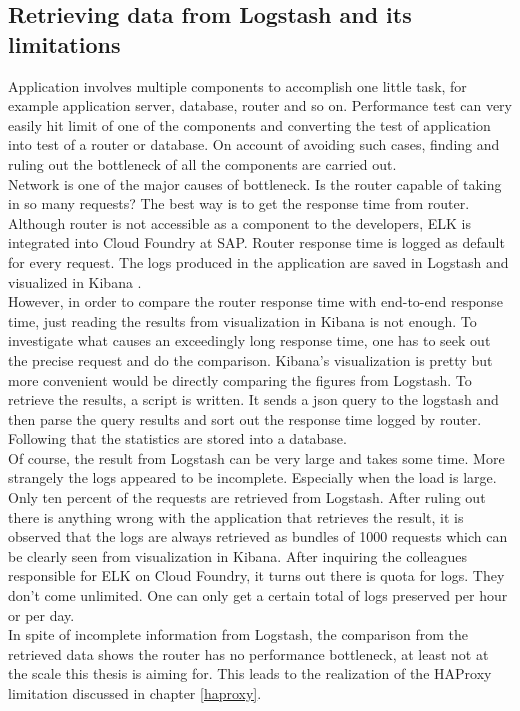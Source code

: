 \subsection{Retrieving data from Logstash and its limitations}
Application involves multiple components to accomplish one little task, for example application server, database, router and so on. Performance test can very easily hit limit of one of the components and converting the test of application into test of a router or database. On account of avoiding such cases, finding and ruling out the bottleneck of all the components are carried out. \\
Network is one of the major causes of bottleneck. Is the router capable of taking in so many requests? The best way is to get the response time from router. Although router is not accessible as a component to the developers, \ac{ELK} \citep{ELK} is integrated into Cloud Foundry at SAP. Router response time is logged as default for every request. The logs produced in the application are saved in Logstash\citep{Logstash} and visualized in Kibana \citep{Kibana}. \\ 
However, in order to compare the router response time with end-to-end response time, just reading the results from visualization in Kibana is not enough. To investigate what causes an exceedingly long response time, one has to seek out the precise request and do the comparison. Kibana's visualization is pretty but more convenient would be directly comparing the figures from Logstash. To retrieve the results, a script is written. It sends a json query to the logstash and then parse the query results and sort out the response time logged by router. Following that the statistics are stored into a database.\\
Of course, the result from Logstash can be very large and takes some time. More strangely the logs appeared to be incomplete. Especially when the load is large. Only ten percent of the requests are retrieved from Logstash. After ruling out there is anything wrong with the application that retrieves the result, it is observed that the logs are always retrieved as bundles of 1000 requests which can be clearly seen from visualization in Kibana. After inquiring the colleagues responsible for ELK on Cloud Foundry,  it turns out there is quota for logs. They don't come unlimited. One can only get a certain total of logs preserved per hour or per day.\\
In spite of incomplete information from Logstash, the comparison from the retrieved data shows the router has no performance bottleneck, at least not at the scale this thesis is aiming for. This leads to the realization of the HAProxy limitation discussed in chapter \ref{haproxy}. 

